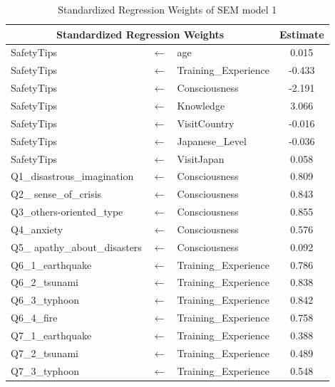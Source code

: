\begin{table}[h]
  \caption{Standardized Regression Weights of SEM model 1 }
  \label{table10}
  \centering
  \begin{tabular}{lcl|c}
 \hline
 \multicolumn{3}{c|}{Standardized Regression Weights} & Estimate  \\
 \hline
SafetyTips              &$\longleftarrow$ & age                  & 0.015  \\
SafetyTips              &$\longleftarrow$ & Training\_Experience & -0.433 \\
SafetyTips              &$\longleftarrow$ & Consciousness        & -2.191 \\
SafetyTips              &$\longleftarrow$ & Knowledge            & 3.066  \\
SafetyTips              &$\longleftarrow$ & VisitCountry         & -0.016 \\
SafetyTips              &$\longleftarrow$ & Japanese\_Level      & -0.036 \\
SafetyTips              &$\longleftarrow$ & VisitJapan           & 0.058  \\
Q1\_disastrous\_imagination                      &$\longleftarrow$ & Consciousness        & 0.809  \\
Q2\_ sense\_of\_crisis                      &$\longleftarrow$ & Consciousness        & 0.843  \\
Q3\_others-oriented\_type                      &$\longleftarrow$ & Consciousness        & 0.855  \\
Q4\_anxiety                      &$\longleftarrow$ & Consciousness        & 0.576  \\
Q5\_ apathy\_about\_disasters                      &$\longleftarrow$ & Consciousness        & 0.092  \\
Q6\_1\_earthquake       &$\longleftarrow$ & Training\_Experience & 0.786  \\
Q6\_2\_tsunami          &$\longleftarrow$ & Training\_Experience & 0.838  \\
Q6\_3\_typhoon          &$\longleftarrow$ & Training\_Experience & 0.842  \\
Q6\_4\_fire             &$\longleftarrow$ & Training\_Experience & 0.758  \\
Q7\_1\_earthquake       &$\longleftarrow$ & Training\_Experience & 0.388  \\
Q7\_2\_tsunami          &$\longleftarrow$ & Training\_Experience & 0.489  \\
Q7\_3\_typhoon          &$\longleftarrow$ & Training\_Experience & 0.548  \\

\end{tabular}
\end{table}
